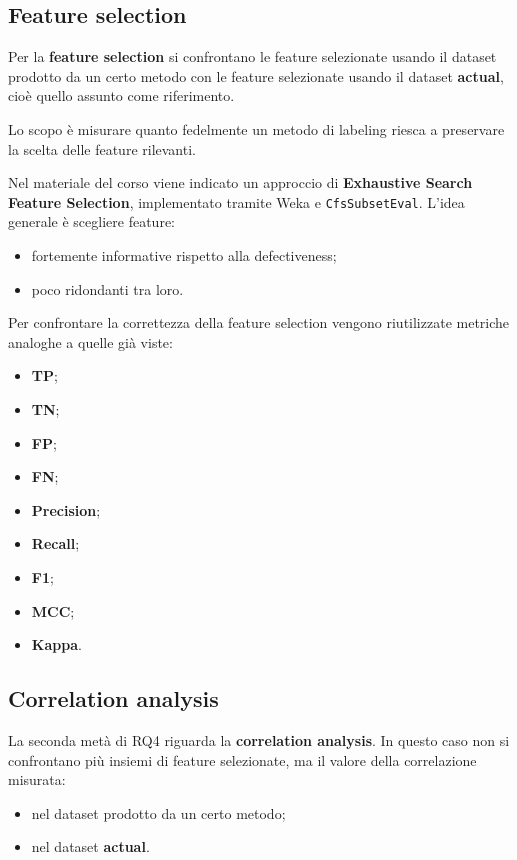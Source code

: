 \subsection{Feature selection}

Per la \textbf{feature selection} si confrontano le feature selezionate usando il dataset prodotto da un certo metodo con le feature selezionate usando il dataset \textbf{actual}, cioè quello assunto come riferimento.

Lo scopo è misurare quanto fedelmente un metodo di labeling riesca a preservare la scelta delle feature rilevanti.

Nel materiale del corso viene indicato un approccio di \textbf{Exhaustive Search Feature Selection}, implementato tramite Weka e \texttt{CfsSubsetEval}. L'idea generale è scegliere feature:

\begin{itemize}
    \item fortemente informative rispetto alla defectiveness;
    \item poco ridondanti tra loro.
\end{itemize}

Per confrontare la correttezza della feature selection vengono riutilizzate metriche analoghe a quelle già viste:

\begin{itemize}
    \item \textbf{TP};
    \item \textbf{TN};
    \item \textbf{FP};
    \item \textbf{FN};
    \item \textbf{Precision};
    \item \textbf{Recall};
    \item \textbf{F1};
    \item \textbf{MCC};
    \item \textbf{Kappa}.
\end{itemize}

\subsection{Correlation analysis}

La seconda metà di RQ4 riguarda la \textbf{correlation analysis}. In questo caso non si confrontano più insiemi di feature selezionate, ma il valore della correlazione misurata:

\begin{itemize}
    \item nel dataset prodotto da un certo metodo;
    \item nel dataset \textbf{actual}.
\end{itemize}

